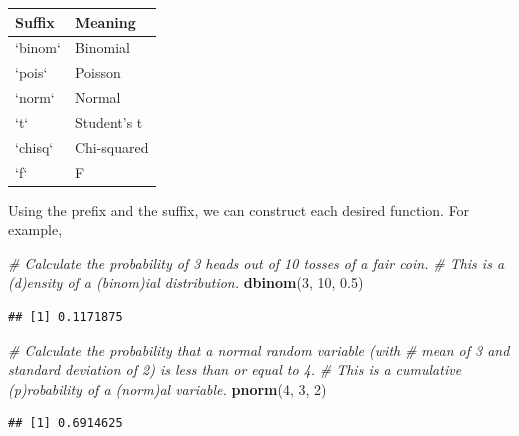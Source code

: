 \documentclass[]{book}
\newenvironment{Shaded}{\begin{snugshade}}{\end{snugshade}}
\newcommand{\CommentTok}[1]{\textcolor[rgb]{0.56,0.35,0.01}{\textit{#1}}}
\newcommand{\DecValTok}[1]{\textcolor[rgb]{0.00,0.00,0.81}{#1}}
\newcommand{\FloatTok}[1]{\textcolor[rgb]{0.00,0.00,0.81}{#1}}
\newcommand{\KeywordTok}[1]{\textcolor[rgb]{0.13,0.29,0.53}{\textbf{#1}}}
\newcommand{\NormalTok}[1]{#1}
\begin{document}
\begin{tabular}{l|l}
\hline
Suffix & Meaning\\
\hline
`binom` & Binomial\\
\hline
`pois` & Poisson\\
\hline
`norm` & Normal\\
\hline
`t` & Student's t\\
\hline
`chisq` & Chi-squared\\
\hline
`f` & F\\
\hline
\end{tabular}

Using the prefix and the suffix, we can construct each desired function. For example,

\begin{Shaded}
\begin{Highlighting}[]
\CommentTok{# Calculate the probability of 3 heads out of 10 tosses of a fair coin.}
\CommentTok{# This is a (d)ensity of a (binom)ial distribution.}
\KeywordTok{dbinom}\NormalTok{(}\DecValTok{3}\NormalTok{, }\DecValTok{10}\NormalTok{, }\FloatTok{0.5}\NormalTok{)}
\end{Highlighting}
\end{Shaded}

\begin{verbatim}
## [1] 0.1171875
\end{verbatim}

\begin{Shaded}
\begin{Highlighting}[]
\CommentTok{# Calculate the probability that a normal random variable (with }
\CommentTok{# mean of 3 and standard deviation of 2) is less than or equal to 4.}
\CommentTok{# This is a cumulative (p)robability of a (norm)al variable.}
\KeywordTok{pnorm}\NormalTok{(}\DecValTok{4}\NormalTok{, }\DecValTok{3}\NormalTok{, }\DecValTok{2}\NormalTok{)}
\end{Highlighting}
\end{Shaded}

\begin{verbatim}
## [1] 0.6914625
\end{verbatim}

\begin{Shaded}
\end{Shaded}
\end{document}
